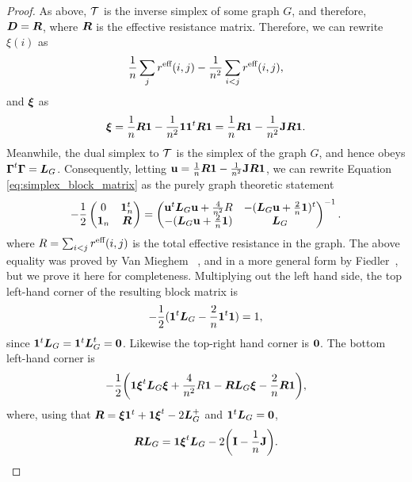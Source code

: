 \begin{proof}
As above, $\mathcal{T}$ is the inverse simplex of some graph $G$, and therefore, $\vb*{D}=\vb*{R}$, where $\vb*{R}$ is the effective resistance matrix. Therefore, we can rewrite $\xi(i)$ as 
\begin{align*}
\frac{1}{n}\sum_j r^{\text{eff}}(i,j) - \frac{1}{n^2}\sum_{i<j}r^{\text{eff}}(i,j),
\end{align*}
and $\vb*{\xi}$ as 
\begin{align*}
\vb*{\xi} = \frac{1}{n}\vb*{R}\vb{1} - \frac{1}{n^2} \vb{1} \vb{1}^t \vb*{R}\vb{1} = \frac{1}{n}\vb*{R}\vb{1} - \frac{1}{n^2} \vb{J} \vb*{R}\vb{1}.
\end{align*}
Meanwhile, the dual simplex to $\mathcal{T}$ is the simplex of the graph $G$, and hence obeys $\vb*{\Gamma}^t\vb*{\Gamma}=\vb*{L}_G$. Consequently, letting $\vb{u}=\frac{1}{n}\vb*{R}\vb{1} - \frac{1}{n^2} \vb{J} \vb*{R}\vb{1}$, we can rewrite Equation \ref{eq:simplex_block_matrix} as the purely graph theoretic statement  
\begin{equation}
\label{eq:block_inverse_er}
	-\frac{1}{2} \begin{pmatrix}
0 & \vb{1}_n^t \\ 
\vb{1}_n &  \vb*{R}
\end{pmatrix} = 
\begin{pmatrix}
\vb{u}^t \vb*{L}_G\vb{u} + \frac{4}{n^2}R & -(\vb*{L}_G\vb{u} + \frac{2}{n}\vb{1})^t \\
-(\vb*{L}_G\vb{u} + \frac{2}{n}\vb{1}) & \vb*{L}_G
\end{pmatrix}^{-1}.
\end{equation}
where $R=\sum_{i<j}r^{\text{eff}}(i,j)$ is the total effective resistance in the graph. The above equality was proved by Van Mieghem \etal~\cite{van2017pseudoinverse}, and in a more general form by Fiedler~\cite{fiedler1993geometric,fiedler2011matrices}, but we prove it here for completeness. Multiplying out the left hand side, the top left-hand corner of the resulting block matrix is
\[-\frac{1}{2}(\vb{1}^t\vb*{L}_G - \frac{2}{n}\vb{1}^t \vb{1}) = 1,\]
since $\vb{1}^t \vb*{L}_G=\vb{1}^t\vb*{L}_G^t =\vb{0}$. Likewise the top-right hand corner is $\vb{0}$. The bottom left-hand corner is 
\begin{equation}
\label{eq:lem_block_matrix}
-\frac{1}{2}\bigg(\vb{1}\vb*{\xi}^t \vb*{L}_G\vb*{\xi} +\frac{4}{n^2} R \vb{1} - \vb*{R}\vb*{L}_G\vb*{\xi} - \frac{2}{n}\vb*{R}\vb{1}\bigg),
\end{equation}
where, using that $\vb*{R}=\vb*{\xi} \vb{1}^t + \vb{1} \vb*{\xi}^t -2\vb*{L}_G^+$ and $\vb{1}^t\vb*{L}_G=\vb{0}$, 
\begin{align}
\vb*{R}\vb*{L}_G = \vb{1}\vb*{\xi}^t \vb*{L}_G - 2\bigg(\vb{I}-\frac{1}{n}\vb{J}\bigg).\label{eq:lem_block_matrix2}
\end{align}

\end{proof}
